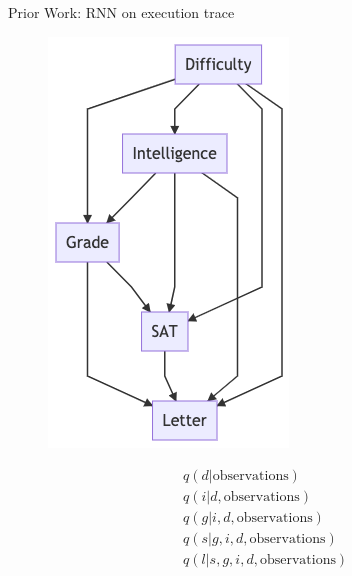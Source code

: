 \begin{frame}[fragile]{Prior Work: RNN on execution trace \parencite{le2017inference}}
\begin{minipage}{0.4\linewidth}
    \begin{figure}
        \centering
        \includegraphics[width=\linewidth]{Figures/lic/student-network-smc-ic.png}
    \end{figure}
\end{minipage}
\begin{minipage}{0.5\linewidth}
    \begin{align*}
        & q(d | \text{observations}) \\
        & q(i|d, \text{observations}) \\
        & q(g | i, d, \text{observations}) \\
        & q(s | g, i, d, \text{observations}) \\
        & q(l | s, g, i, d, \text{observations})
    \end{align*}
\end{minipage}
\end{frame}

